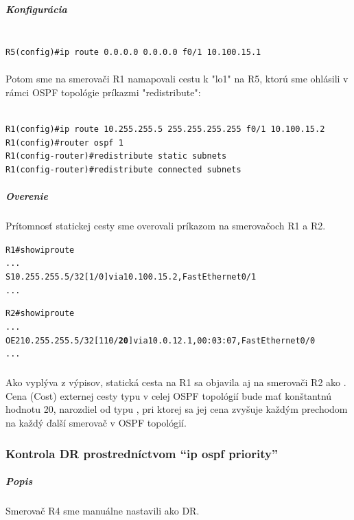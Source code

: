 \documentclass[12pt,twoside,a4paper]{article}
\begin{document}
\subparagraph{Konfigurácia}
\noindent
{\selectfont
\begin{small}
\begin{verbatim}

R5(config)#ip route 0.0.0.0 0.0.0.0 f0/1 10.100.15.1

\end{verbatim}
\end{small}
}

\paragraph{}
Potom sme na smerovači R1 namapovali cestu k "lo1" na R5, ktorú sme ohlásili v rámci OSPF topológie príkazmi "redistribute":

\noindent
{\selectfont
\begin{small}
\begin{verbatim}

R1(config)#ip route 10.255.255.5 255.255.255.255 f0/1 10.100.15.2
R1(config)#router ospf 1
R1(config-router)#redistribute static subnets
R1(config-router)#redistribute connected subnets

\end{verbatim}
\end{small}
}

\subparagraph{Overenie}
\subparagraph{}
Prítomnosť statickej cesty sme overovali príkazom  na smerovačoch R1 a R2.

\noindent
{\selectfont
\begin{small}
\begin{alltt}

R1#show ip route
...
S       10.255.255.5/32 [1/0] via 10.100.15.2, FastEthernet0/1
...




R2#show ip route
...
O E2    10.255.255.5/32 [110/\textbf{20}] via 10.0.12.1, 00:03:07, FastEthernet0/0
...
\end{alltt}
\end{small}
}

\subparagraph{}
Ako vyplýva z výpisov, statická cesta na R1 sa objavila aj na smerovači R2 ako . Cena (Cost) externej cesty typu  v celej OSPF topológií bude mať konštantnú hodnotu 20, narozdiel od typu , pri ktorej sa jej cena zvyšuje každým prechodom na každý ďalší smerovač v OSPF topológií.



\subsubsection*{Kontrola DR prostredníctvom  “ip ospf priority”}
\subparagraph{Popis}
\subparagraph{}
Smerovač R4 sme manuálne nastavili ako DR.
\end{document}
